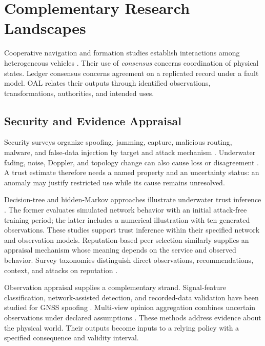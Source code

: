 \section{Complementary Research Landscapes}

Cooperative navigation and formation studies establish interactions among heterogeneous vehicles \citep{wu2020cooperative,ke2022cooperative,xue2021distributed,liu2023formation}. Their use of \emph{consensus} concerns coordination of physical states. Ledger consensus concerns agreement on a replicated record under a fault model. OAL relates their outputs through identified observations, transformations, authorities, and intended uses.

\subsection{Security and Evidence Appraisal}

Security surveys organize spoofing, jamming, capture, malicious routing, malware, and false-data injection by target and attack mechanism \citep{yahuza2021internet,mekdad2023survey,jiang2019securing,adam2024state}. Underwater fading, noise, Doppler, and topology change can also cause loss or disagreement \citep{ali2020recent,jouhari2019underwater,mohsan2022towards}. A trust estimate therefore needs a named property and an uncertainty status: an anomaly may justify restricted use while its cause remains unresolved.

Decision-tree and hidden-Markov approaches illustrate underwater trust inference \citep{jiang2020dynamic,arifeen2020hidden}. The former evaluates simulated network behavior with an initial attack-free training period; the latter includes a numerical illustration with ten generated observations. These studies support trust inference within their specified network and observation models. Reputation-based peer selection \citep{kamvar2003eigentrust} similarly supplies an appraisal mechanism whose meaning depends on the service and observed behavior. Survey taxonomies distinguish direct observations, recommendations, context, and attacks on reputation \citep{ahmed2019trust,aaqib2023iot,junior2021survey,liu2023survey}.

Observation appraisal supplies a complementary strand. Signal-feature classification, network-assisted detection, and recorded-data validation have been studied for GNSS spoofing \citep{shafique2021detecting,dang2022deep,semanjski2020use}. Multi-view opinion aggregation combines uncertain observations under declared assumptions \citep{liu2022trusted}. These methods address evidence about the physical world. Their outputs become inputs to a relying policy with a specified consequence and validity interval.


